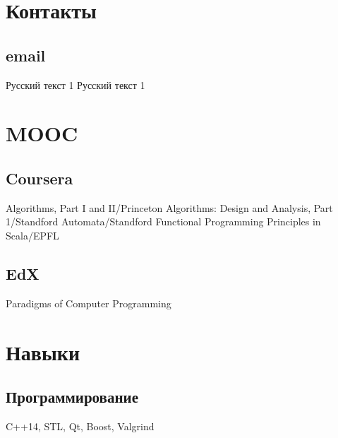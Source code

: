 \documentclass[a4paper]{curricula-vitae}
\begin{document}




\begin{minipage}[t]{0.33\textwidth} %

\section{Контакты} 
\subsection{email}
Русский текст 1
Русский текст 1

\section{MOOC}
\subsection{Coursera}
Algorithms, Part I and II/Princeton
Algorithms: Design and Analysis, Part 1/Standford
Automata/Standford
Functional Programming Principles in Scala/EPFL

\subsection{EdX}
Paradigms of Computer Programming

\section{Навыки}

\subsection{Программирование}
C++14, STL, Qt, Boost, Valgrind


\end{minipage}
\end{document}
